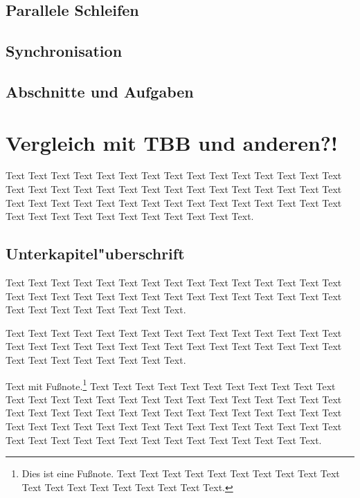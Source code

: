 \documentclass[a4paper,11pt]{scrartcl}
\begin{document}
\subsection{Parallele Schleifen} \subsection{Synchronisation} \subsection{Abschnitte und
Aufgaben}

\pagebreak %

\section{Vergleich mit TBB und anderen?!}

Text Text Text Text Text Text Text Text Text Text Text Text Text Text Text Text Text Text
Text Text Text Text Text Text Text Text Text Text Text Text Text Text Text Text Text Text
Text Text Text Text Text Text Text Text Text Text Text Text Text Text Text Text Text Text
Text Text.

\subsection{Unterkapitel"uberschrift}

Text Text Text Text Text Text Text Text Text Text Text Text Text Text Text Text Text Text
Text Text Text Text Text Text Text Text Text Text Text Text Text Text Text Text Text Text
Text Text.


Text Text Text Text Text Text Text Text Text Text Text Text Text Text Text Text Text Text
Text Text Text Text Text Text Text Text Text Text Text Text Text Text Text Text Text Text
Text Text.

Text mit Fußnote.\footnote{Dies ist eine Fußnote. Text Text Text Text Text Text Text Text
Text Text Text Text Text Text Text Text Text Text Text.} Text \cite{Ez99,ABC01} Text Text
Text Text Text Text Text Text Text Text Text Text Text Text Text Text Text Text Text Text
Text Text Text Text Text Text Text Text  Text Text Text Text Text Text Text Text Text Text
Text Text Text Text Text Text Text Text Text Text Text Text Text Text Text Text Text Text
Text Text Text Text Text Text Text Text Text Text Text Text Text.
\end{document}
